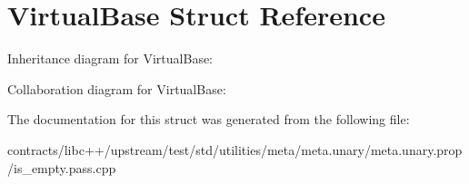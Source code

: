 \hypertarget{struct_virtual_base}{}\section{Virtual\+Base Struct Reference}
\label{struct_virtual_base}


Inheritance diagram for Virtual\+Base\+:


Collaboration diagram for Virtual\+Base\+:


The documentation for this struct was generated from the following file\+:\begin{DoxyCompactItemize}
\item 
contracts/libc++/upstream/test/std/utilities/meta/meta.\+unary/meta.\+unary.\+prop/is\+\_\+empty.\+pass.\+cpp\end{DoxyCompactItemize}
